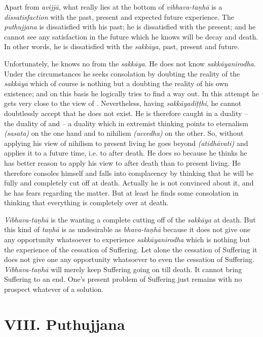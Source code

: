 \protect\hypertarget{vibhava-tanha}{}{}Apart from \emph{avijjā}, what really lies at the bottom of \emph{vibhava-taṇhā} is a \emph{dissatisfaction} with the past, present and expected future experience. The \emph{puthujjana} is dissatisfied with his past; he is dissatisfied with the present; and he cannot see any satisfaction in the future which he knows will be decay and death. In other words, he is dissatisfied with the \emph{sakkāya}, past, present and future.

Unfortunately, he knows no  from the \emph{sakkāya}. He does not know \emph{sakkāyanirodha}. Under the circumstances he seeks consolation by doubting the reality of the \emph{sakkāya} which of course is nothing but a doubting the reality of his own existence; and on this basis he logically tries to find a way out. In this attempt he gets very close to the view of . Nevertheless, having \emph{sakkāyadiṭṭhi}, he cannot doubtlessly accept that he does not exist. He is therefore caught in a duality -- the duality of  and  -- a duality which in extremist thinking points to eternalism \emph{(sasata)} on the one hand and to nihilism \emph{(uccedha)} on the other. So, without applying his view of nihilism to present living he goes beyond \emph{(atidhāvati)} and applies it to a future time, i.e. to after death. He does so because he thinks he has better reason to apply his view to after death than to present living. He therefore consoles himself and falls into complacency by thinking that he will be fully and completely cut off at death. Actually he is not convinced about it, and he has fears regarding the matter. But at least he finds some consolation in thinking that everything is completely over at death.

\emph{Vibhava-taṇhā} is the wanting a complete cutting off of the \emph{sakkāya} at death. But this kind of \emph{taṇhā} is as undesirable as \emph{bhava-taṇhā} because it does not give one any opportunity whatsoever to experience \emph{sakkāyanirodha} which is nothing but the experience of the cessation of Suffering. Let alone  the cessation of Suffering it does not give one any opportunity whatsoever to even  the cessation of Suffering. \emph{Vibhava-taṇhā} will merely keep Suffering going on till death. It cannot bring Suffering to an end. One's present problem of Suffering just remains with no prospect whatever of a solution.

\hypertarget{_viii_puthujjana}{%
\section{VIII. Puthujjana}\label{_viii_puthujjana}}

